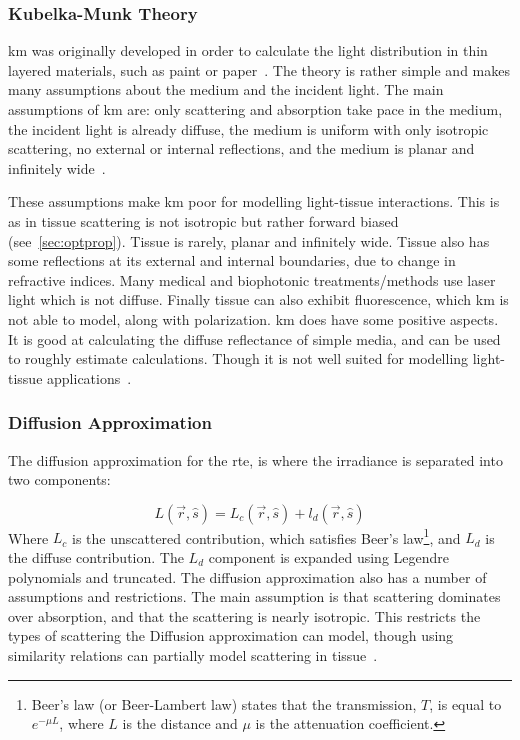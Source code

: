 \subsubsection*{Kubelka-Munk Theory}
\gls*{km} was originally developed in order to calculate the light distribution in thin layered materials, such as paint or paper~\cite{barbaric2011kubelka}. The theory is rather simple and makes many assumptions about the medium and the incident light. The main assumptions of \gls*{km} are: only scattering and absorption take pace in the medium, the incident light is already diffuse, the medium is uniform with only isotropic scattering, no external or internal reflections, and the medium is planar and infinitely wide~\cite{jasinski2011modelling,cheong1990review,gabriela2013mathematical}.

These assumptions make \gls*{km} poor for modelling light-tissue interactions. This is as in tissue scattering is not isotropic but rather forward biased (see~\cref{sec:optprop}). Tissue is rarely, planar and infinitely wide. Tissue also has some reflections at its external and internal boundaries, due to change in refractive indices. Many medical and biophotonic treatments/methods use laser light which is not diffuse. Finally tissue can also exhibit fluorescence, which \gls*{km} is not able to model, along with polarization. 
\gls*{km} does have some positive aspects. It is good at calculating the diffuse reflectance of simple media, and can be used to roughly estimate calculations. Though it is not well suited for modelling light-tissue applications~\cite{prahl1990light}.

\subsubsection*{Diffusion Approximation}
The diffusion approximation for the \gls*{rte}, is where the irradiance is separated into two components:

\begin{equation}
	L(\vec{r},\hat{s}) = L_c(\vec{r},\hat{s}) +l_d(\vec{r},\hat{s})
\end{equation}
Where $L_c$ is the unscattered contribution, which satisfies Beer's law\footnote{Beer's law (or Beer-Lambert law) states that the transmission, $T$, is equal to $e^{-\mu L}$, where $L$ is the distance and $\mu$ is the attenuation coefficient.}, and $L_d$ is the diffuse contribution. The $L_d$ component is expanded using Legendre polynomials and truncated. 
The diffusion approximation also has a number of assumptions and restrictions. The main assumption is that scattering dominates over absorption, and that the scattering is nearly isotropic. This restricts the types of scattering the Diffusion approximation can model, though using similarity relations can partially model scattering in tissue~\cite{graaff1993similarity,yoon1989accuracies}.

